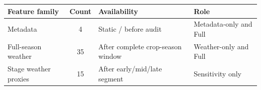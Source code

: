 \begin{tabular}{lcll}
\toprule
Feature family & Count & Availability & Role \\
\midrule
Metadata & 4 & Static / before audit & Metadata-only and Full \\
Full-season weather & 35 & After complete crop-season window & Weather-only and Full \\
Stage weather proxies & 15 & After early/mid/late segment & Sensitivity only \\
\bottomrule
\end{tabular}
